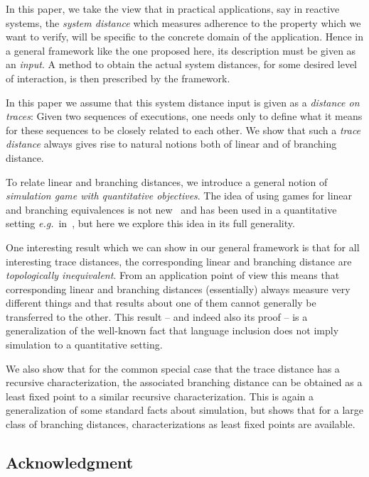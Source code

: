\documentclass[copyright,creativecommons,sharealike]{eptcs}
\theoremstyle{plain}
\newcommand*\eg{\textit{e.g.}}
\begin{document}
In this paper, we take the view that in practical applications, say in
reactive systems, the \emph{system distance} which measures adherence
to the property which we want to verify, will be specific to the
concrete domain of the application. Hence in a general framework like
the one proposed here, its description must be given as an
\emph{input}. A method to obtain the actual system distances, for some
desired level of interaction, is then prescribed by the framework.

In this paper we assume that this system distance input is given as a
\emph{distance on traces}: Given two sequences of executions, one
needs only to define what it means for these sequences to be closely
related to each other.  We show that such a \emph{trace distance}
always gives rise to natural notions both of linear and of branching
distance.

To relate linear and branching distances, we introduce a general
notion of \emph{simulation game with quantitative objectives}.  The
idea of using games for linear and branching equivalences is not
new~\cite{DBLP:conf/banff/Stirling95} and has been used in a
quantitative setting
\eg~in~\cite{conf/csl/ChatterjeeDH08,DBLP:conf/qest/DesharnaisLT08},
but here we explore this idea in its full generality.

One interesting result which we can show in our general framework is
that for all interesting trace distances, the corresponding linear and
branching distance are \emph{topologically inequivalent}.  From an
application point of view this means that corresponding linear and
branching distances (essentially) always measure very different things
and that results about one of them cannot generally be transferred to
the other.  This result -- and indeed also its proof -- is a
generalization of the well-known fact that language inclusion does not
imply simulation to a quantitative setting.

We also show that for the common special case that the trace distance
has a recursive characterization, the associated branching distance
can be obtained as a least fixed point to a similar recursive
characterization.  This is again a generalization of some standard
facts about simulation, but shows that for a large class of branching
distances, characterizations as least fixed points are available.

\subsection*{Acknowledgment}
\end{document}

